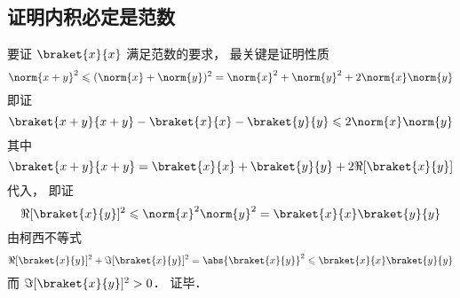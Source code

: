 \subsection{证明内积必定是范数}
要证 $\braket{x}{x}$ 满足范数的要求， 最关键是证明性质
\begin{equation}
\norm{x+y}^2 \leqslant (\norm{x} + \norm{y})^2 = \norm{x}^2 + \norm{y}^2 + 2\norm{x}\norm{y}
\end{equation}
即证
\begin{equation}
\braket{x+y}{x+y} - \braket{x}{x} - \braket{y}{y} \leqslant 2\norm{x}\norm{y}
\end{equation}
其中
\begin{equation}
\braket{x+y}{x+y} = \braket{x}{x} + \braket{y}{y} + 2\Re[{\braket{x}{y}}]
\end{equation}
代入， 即证
\begin{equation}\label{InerPd_eq5}
\Re[{\braket{x}{y}}]^2 \leqslant \norm{x}^2\norm{y}^2 = \braket{x}{x}\braket{y}{y}
\end{equation}
由柯西不等式
\begin{equation}
\Re[\braket{x}{y}]^2 + \Im[\braket{x}{y}]^2 = \abs{\braket{x}{y}}^2 \leqslant \braket{x}{x}\braket{y}{y}
\end{equation}
而 $\Im[\braket{x}{y}]^2 > 0$． 证毕．
